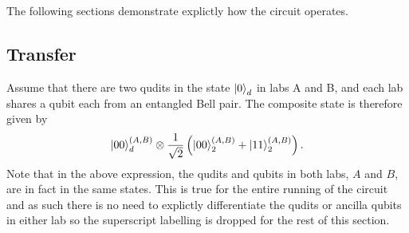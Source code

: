 The following sections demonstrate explictly how the circuit operates.

\subsection{Transfer}
\label{subsection:aqctransfer}
Assume that there are two qudits in the state $\ket{0}_d$ in labs A and B, and each lab shares a qubit each from an entangled Bell pair. The composite state is therefore given by
\begin{equation}
    \ket{00}_d^{(A,B)}\otimes\frac{1}{\sqrt{2}}\left(\ket{00}^{(A,B)}_2 + \ket{11}^{(A,B)}_2\right).
\end{equation}
Note that in the above expression, the qudits and qubits in both labs, $A$ and $B$, are in fact in the same states.
This is true for the entire running of the circuit and as such there is no need to explictly differentiate the qudits or ancilla qubits in either lab so the superscript labelling is dropped for the rest of this section.\newline

